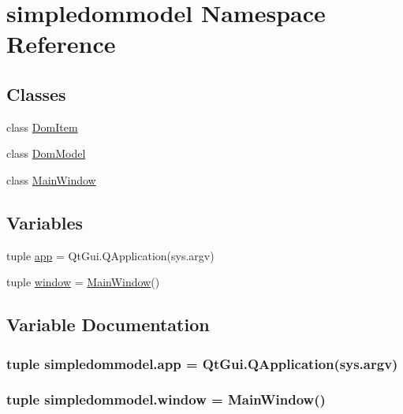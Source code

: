\hypertarget{namespacesimpledommodel}{}\section{simpledommodel Namespace Reference}
\label{namespacesimpledommodel}
\subsection*{Classes}
\begin{DoxyCompactItemize}
\item 
class \hyperlink{classsimpledommodel_1_1DomItem}{Dom\+Item}
\item 
class \hyperlink{classsimpledommodel_1_1DomModel}{Dom\+Model}
\item 
class \hyperlink{classsimpledommodel_1_1MainWindow}{Main\+Window}
\end{DoxyCompactItemize}
\subsection*{Variables}
\begin{DoxyCompactItemize}
\item 
tuple \hyperlink{namespacesimpledommodel_aee5109483283e20a45a0775455ef75de}{app} = Qt\+Gui.\+Q\+Application(sys.\+argv)
\item 
tuple \hyperlink{namespacesimpledommodel_a874cb35fc5c6b176b5b0741d63548645}{window} = \hyperlink{classsimpledommodel_1_1MainWindow}{Main\+Window}()
\end{DoxyCompactItemize}


\subsection{Variable Documentation}
\hypertarget{namespacesimpledommodel_aee5109483283e20a45a0775455ef75de}{}
\subsubsection[{app}]{\setlength{\rightskip}{0pt plus 5cm}tuple simpledommodel.\+app = Qt\+Gui.\+Q\+Application(sys.\+argv)}\label{namespacesimpledommodel_aee5109483283e20a45a0775455ef75de}
\hypertarget{namespacesimpledommodel_a874cb35fc5c6b176b5b0741d63548645}{}
\subsubsection[{window}]{\setlength{\rightskip}{0pt plus 5cm}tuple simpledommodel.\+window = {\bf Main\+Window}()}\label{namespacesimpledommodel_a874cb35fc5c6b176b5b0741d63548645}
